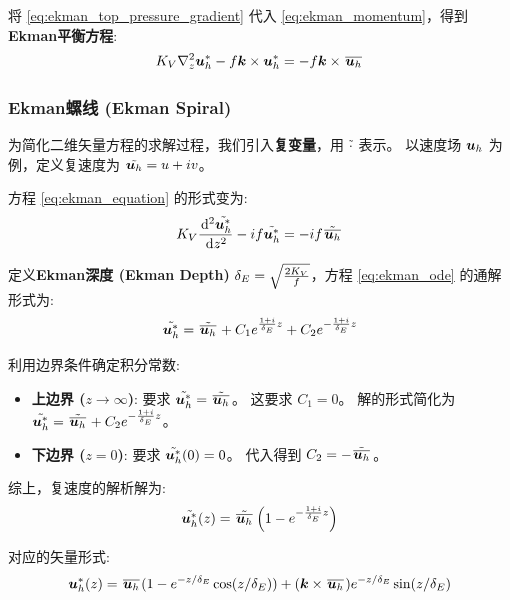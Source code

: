 将 \eqref{eq:ekman_top_pressure_gradient} 代入 \eqref{eq:ekman_momentum}，得到\textbf{Ekman平衡方程}:
\begin{equation}
    K_V \nabla_z^2 \bm{u}_h^* - f \bm{k} \times \bm{u}_h^* = -f \bm{k} \times \mkern2mu \overline{\bm{u}_h} \mkern2mu
    \label{eq:ekman_equation}
\end{equation}

\subsubsection{Ekman螺线 (Ekman Spiral)}

为简化二维矢量方程的求解过程，我们引入\textbf{复变量}，用 $\tilde{\cdot}$ 表示。
以速度场 $\bm{u}_h$ 为例，定义复速度为 $\tilde{\bm{u}_h} = u + i v$。

方程 \eqref{eq:ekman_equation} 的形式变为:
\begin{equation}
    \eddyviscv \ode[2]{\complex{\flayer{\vel_h}}}{z} - i \coriolis \complex{\flayer{\vel_h}} = -i \coriolis \complex{\mean{\vel_h}}
    \label{eq:ekman_ode}
\end{equation}

定义\textbf{Ekman深度 (Ekman Depth)} $\delta_E = \sqrt{\frac{2K_V}{f}}$，方程 \eqref{eq:ekman_ode} 的通解形式为:
\begin{equation*}
    \tilde{\bm{u}_h^*} = \tilde{\mkern2mu \overline{\bm{u}_h} \mkern2mu} + C_1 e^{\frac{1+i}{\delta_E} z} + C_2 e^{-\frac{1+i}{\delta_E} z}
\end{equation*}

利用边界条件确定积分常数:
\begin{itemize}
    \item \textbf{上边界 ($z \to \infty$)}: 要求 $\tilde{\bm{u}_h^*} = \tilde{\mkern2mu \overline{\bm{u}_h} \mkern2mu}$。
    这要求 $C_1 = 0$。
    解的形式简化为 $\tilde{\bm{u}_h^*} = \tilde{\mkern2mu \overline{\bm{u}_h} \mkern2mu} + C_2 e^{-\frac{1+i}{\delta_E} z}$。

    \item \textbf{下边界 ($z = 0$)}: 要求 $\tilde{\bm{u}_h^*}(0) = 0$。
    代入得到 $C_2 = -\tilde{\mkern2mu \overline{\bm{u}_h} \mkern2mu}$。
\end{itemize}

综上，复速度的解析解为:
\begin{equation}
    \tilde{\bm{u}_h^*}(z) = \tilde{\mkern2mu \overline{\bm{u}_h} \mkern2mu} \left(1 - e^{-\frac{1+i}{\delta_E} z}\right)
    \label{eq:ekman_solution_complex}
\end{equation}

对应的矢量形式:
\begin{equation}
    \bm{u}_h^*(z) = \mkern2mu \overline{\bm{u}_h} \mkern2mu (1 - e^{-z / \delta_E} \cos(z / \delta_E)) + (\bm{k} \times \mkern2mu \overline{\bm{u}_h} \mkern2mu) e^{-z / \delta_E} \sin(z / \delta_E)
    \label{eq:ekman_solution}
\end{equation}

